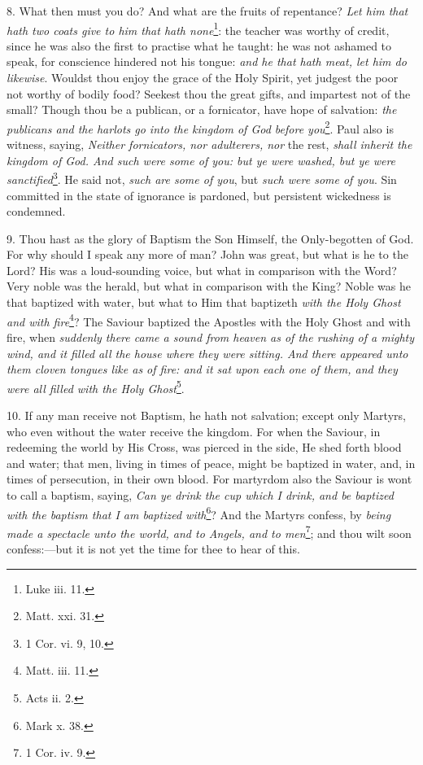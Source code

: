 8. What then must you do? And what are the fruits of repentance? \emph{Let him that hath two coats give to him that hath none}\footnote{Luke iii. 11.}: the teacher was worthy of credit, since he was also the first to practise what he taught: he was not ashamed to speak, for conscience hindered not his tongue: \emph{and he that hath meat, let him do likewise}. Wouldst thou enjoy the grace of the Holy Spirit, yet judgest the poor not worthy of bodily food? Seekest thou the great gifts, and impartest not of the small? Though thou be a publican, or a fornicator, have hope of salvation: \emph{the publicans and the harlots go into the kingdom of God before you}\footnote{Matt. xxi. 31.}. Paul also is witness, saying, \emph{Neither fornicators, nor adulterers, nor} the rest, \emph{shall inherit the kingdom of God. And such were some of you: but ye were washed, but ye were sanctified}\footnote{1 Cor. vi. 9, 10.}. He said not, \emph{such are some of you}, but \emph{such were some of you}. Sin committed in the state of ignorance is pardoned, but persistent wickedness is condemned.

9. Thou hast as the glory of Baptism the Son Himself, the Only-begotten of God. For why should I speak any more of man? John was great, but what is he to the Lord? His was a loud-sounding voice, but what in comparison with the Word? Very noble was the herald, but what in comparison with the King? Noble was he that baptized with water, but what to Him that baptizeth \emph{with the Holy Ghost and with fire}\footnote{Matt. iii. 11.}? The Saviour baptized the Apostles with the Holy Ghost and with fire, when \emph{suddenly there came a sound from heaven as of the rushing of a mighty wind, and it filled all the house where they were sitting. And there appeared unto them cloven tongues like as of fire: and it sat upon each one of them, and they were all filled with the Holy Ghost}\footnote{Acts ii. 2.}.

10. If any man receive not Baptism, he hath not salvation; except only Martyrs, who even without the water receive the kingdom. For when the Saviour, in redeeming the world by His Cross, was pierced in the side, He shed forth blood and water; that men, living in times of peace, might be baptized in water, and, in times of persecution, in their own blood. For martyrdom also the Saviour is wont to call a baptism, saying, \emph{Can ye drink the cup which I drink, and be baptized with the baptism that I am baptized with}\footnote{Mark x. 38.}? And the Martyrs confess, by \emph{being made a spectacle unto the world, and to Angels, and to men}\footnote{1 Cor. iv. 9.}; and thou wilt soon confess:—but it is not yet the time for thee to hear of this.

